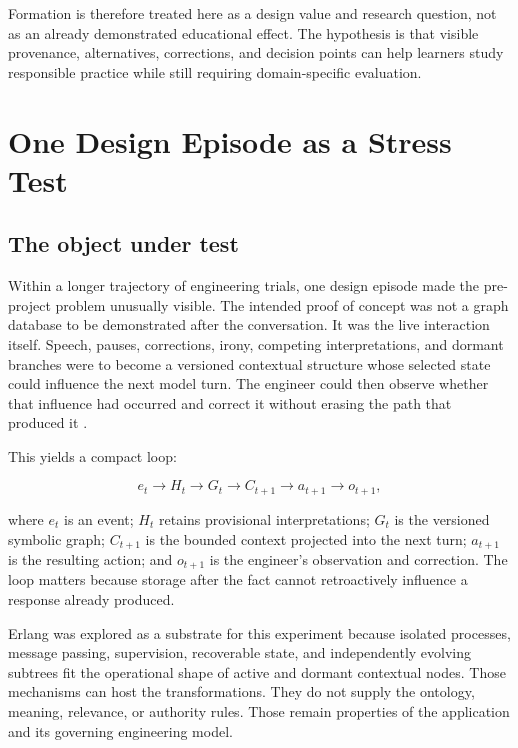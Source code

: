 \documentclass[10pt,a4paper]{article}
\begin{document}
Formation is therefore treated here as a design value and research question, not as an already demonstrated educational effect. The hypothesis is that visible provenance, alternatives, corrections, and decision points can help learners study responsible practice while still requiring domain-specific evaluation.

\section{One Design Episode as a Stress Test}

\subsection{The object under test}

Within a longer trajectory of engineering trials, one design episode made the pre-project problem unusually visible. The intended proof of concept was not a graph database to be demonstrated after the conversation. It was the live interaction itself. Speech, pauses, corrections, irony, competing interpretations, and dormant branches were to become a versioned contextual structure whose selected state could influence the next model turn. The engineer could then observe whether that influence had occurred and correct it without erasing the path that produced it \cite{sessionrecord}.

This yields a compact loop:

\begin{equation}
e_t \longrightarrow H_t \longrightarrow G_t \longrightarrow C_{t+1}
\longrightarrow a_{t+1} \longrightarrow o_{t+1},
\end{equation}

where $e_t$ is an event; $H_t$ retains provisional interpretations; $G_t$ is the versioned symbolic graph; $C_{t+1}$ is the bounded context projected into the next turn; $a_{t+1}$ is the resulting action; and $o_{t+1}$ is the engineer's observation and correction. The loop matters because storage after the fact cannot retroactively influence a response already produced.

Erlang was explored as a substrate for this experiment because isolated processes, message passing, supervision, recoverable state, and independently evolving subtrees fit the operational shape of active and dormant contextual nodes. Those mechanisms can host the transformations. They do not supply the ontology, meaning, relevance, or authority rules. Those remain properties of the application and its governing engineering model.
\end{document}
